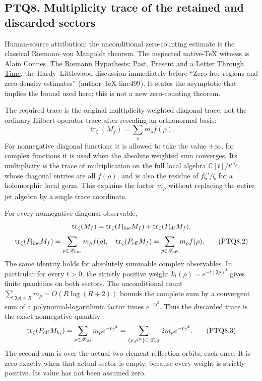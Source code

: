 \subsection{PTQ8. Multiplicity trace of the retained and discarded
sectors}\label{ptq8.-multiplicity-trace-of-the-retained-and-discarded-sectors}

Human-source attribution: the unconditional zero-counting estimate is
the classical Riemann--von Mangoldt theorem. The inspected native-TeX
witness is Alain Connes, \href{https://arxiv.org/abs/2602.04022v1}{The
Riemann Hypothesis: Past, Present and a Letter Through Time}, the
Hardy--Littlewood discussion immediately before ``Zero-free regions and
zero-density estimates'' (author TeX line499). It states the asymptotic
that implies the bound used here; this is not a new zero-counting
theorem.

The required trace is the original multiplicity-weighted diagonal trace,
not the ordinary Hilbert operator trace after rescaling an orthonormal
basis: \[
\operatorname{tr}_\zeta(M_f)=\sum_\rho m_\rho f(\rho).
\tag{PTQ8.1}
\] For nonnegative diagonal functions it is allowed to take the value
\(+\infty\); for complex functions it is used when the absolute weighted
sum converges. Its multiplicity is the trace of multiplication on the
full local algebra \(\mathbb C[t]/t^{m_\rho}\), whose diagonal entries
are all \(f(\rho)\), and is also the residue of \(f\zeta'/\zeta\) for a
holomorphic local germ. This explains the factor \(m_\rho\) without
replacing the entire jet algebra by a single trace coordinate.

For every nonnegative diagonal observable, \[
\operatorname{tr}_\zeta(M_f)
=\operatorname{tr}_\zeta(P_{\rm line}M_f)
+\operatorname{tr}_\zeta(P_{\rm off}M_f),
\] \[
\operatorname{tr}_\zeta(P_{\rm line}M_f)=
\sum_{\rho\in\mathscr Z_{\rm line}}m_\rho f(\rho),
\quad
\operatorname{tr}_\zeta(P_{\rm off}M_f)=
\sum_{\rho\in\mathscr Z_{\rm off}}m_\rho f(\rho).
\tag{PTQ8.2}
\] The same identity holds for absolutely summable complex observables.
In particular for every \(t>0\), the strictly positive weight
\(k_t(\rho)=e^{-t(\Im\rho)^2}\) gives finite quantities on both sectors.
The unconditional count \(\sum_{|\Im\rho|\le R}m_\rho=O(R\log(R+2))\)
bounds the complete sum by a convergent sum of a polynomial-logarithmic
factor times \(e^{-tj^2}\). Thus the discarded trace is the exact
nonnegative quantity \[
\operatorname{tr}_\zeta(P_{\rm off}M_{k_t})
=\sum_{\rho\in\mathscr Z_{\rm off}}m_\rho e^{-t\gamma^2}
=\sum_{\{\rho,\rho^\#\}\subset\mathscr Z_{\rm off}}
2m_\rho e^{-t\gamma^2}.
\tag{PTQ8.3}
\] The second sum is over the actual two-element reflection orbits, each
once. It is zero exactly when that actual sector is empty, because every
weight is strictly positive. Its value has not been assumed zero.

